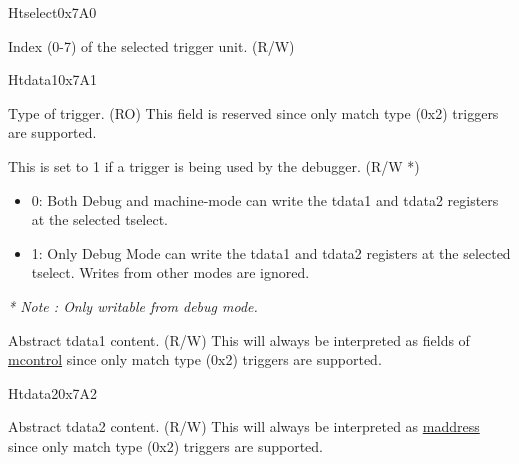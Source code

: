 
\begin{register}{H}{tselect}{0x7A0}\label{regdesc:TSELECT}
%
%
\regnewline%
\begin{regdesc}\begin{reglist}
\label{fielddesc:TSELECT}\item [tselect] Index (0-7) of the selected trigger unit. (R/W)
\end{reglist}\end{regdesc}
\end{register}

\begin{register}{H}{tdata1}{0x7A1}\label{regdesc:TDATA1}
%
%
%
\regnewline%
\begin{regdesc}\begin{reglist}
\label{fielddesc:TDATA1TYPE}\item [type] Type of trigger. (RO) \newline This field is reserved since only match type (0x2) triggers are supported.
\label{fielddesc:TDATA1DMODE}\item [dmode] This is set to 1 if a trigger is being used by the debugger. (R/W *)
\begin{itemize}
    \setlength\itemsep{-1em}
    \item 0: Both Debug and machine-mode can write the tdata1 and tdata2
registers at the selected tselect.
    \item 1: Only Debug Mode can write the tdata1 and tdata2 registers at the selected tselect. Writes from other modes are ignored.
\end{itemize}
\textit{* Note : Only writable from debug mode.}
\label{fielddesc:TDATA1DATA}\item [data] Abstract tdata1 content. (R/W) \newline This will always be interpreted as fields of \hyperref[regdesc:MCONTROL]{mcontrol} since only match type (0x2) triggers are supported.
\end{reglist}\end{regdesc}
\end{register}

\begin{register}{H}{tdata2}{0x7A2}\label{regdesc:TDATA2}
%
\regnewline%
\begin{regdesc}\begin{reglist}
\label{fielddesc:TDATA2}\item [tdata2] Abstract tdata2 content. (R/W) \newline This will always be interpreted as \hyperref[regdesc:MADDRESS]{maddress} since only match type (0x2) triggers are supported.
\end{reglist}\end{regdesc}
\end{register}

